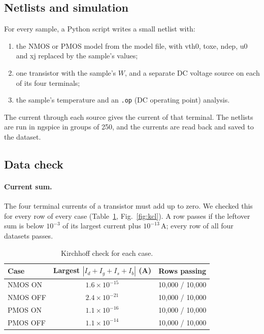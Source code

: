 \documentclass[11pt]{article}
\begin{document}
\subsection{Netlists and simulation}

For every sample, a Python script writes a small netlist with:
\begin{enumerate}
    \item the NMOS or PMOS model from the model file, with vth0, toxe, ndep,
          u0 and xj replaced by the sample's values;
    \item one transistor with the sample's $W$, and a separate DC voltage
          source on each of its four terminals;
    \item the sample's temperature and an \texttt{.op} (DC operating point)
          analysis.
\end{enumerate}
The current through each source gives the current of that terminal. The
netlists are run in ngspice in groups of 250, and the currents are read
back and saved to the dataset.

\subsection{Data check}

\paragraph{Current sum.}
The four terminal currents of a transistor must add up to zero. We checked
this for every row of every case (Table~\ref{tab:kcl}, Fig.~\ref{fig:kcl}).
A row passes if the leftover sum is below $10^{-3}$ of its largest current
plus $10^{-13}$\,A; every row of all four datasets passes.

\begin{table}[H]
\centering
\begin{tabular}{lcc}
\toprule
Case & Largest $|I_d+I_g+I_s+I_b|$ (A) & Rows passing \\
\midrule
NMOS ON  & $1.6\times10^{-15}$ & 10{,}000 / 10{,}000 \\
NMOS OFF & $2.4\times10^{-21}$ & 10{,}000 / 10{,}000 \\
PMOS ON  & $1.1\times10^{-16}$ & 10{,}000 / 10{,}000 \\
PMOS OFF & $1.1\times10^{-14}$ & 10{,}000 / 10{,}000 \\
\bottomrule
\end{tabular}
\caption{Kirchhoff check for each case.}
\label{tab:kcl}
\end{table}
\end{document}
